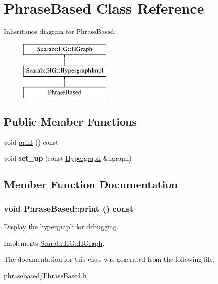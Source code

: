 \hypertarget{classPhraseBased}{
\section{PhraseBased Class Reference}
\label{classPhraseBased}
}
Inheritance diagram for PhraseBased:\begin{figure}[H]
\begin{center}
\leavevmode
\includegraphics[height=3cm]{classPhraseBased}
\end{center}
\end{figure}
\subsection*{Public Member Functions}
\begin{DoxyCompactItemize}
\item 
void \hyperlink{classPhraseBased_aafc2997b58b3698fed7cb5a1f6f269c6}{print} () const 
\item 
\hypertarget{classPhraseBased_a3883660c72be6ce8daab08f368317853}{
void {\bfseries set\_\-up} (const \hyperlink{classHypergraph}{Hypergraph} \&hgraph)}
\label{classPhraseBased_a3883660c72be6ce8daab08f368317853}

\end{DoxyCompactItemize}


\subsection{Member Function Documentation}
\hypertarget{classPhraseBased_aafc2997b58b3698fed7cb5a1f6f269c6}{
\subsubsection[{print}]{\setlength{\rightskip}{0pt plus 5cm}void PhraseBased::print () const}}
\label{classPhraseBased_aafc2997b58b3698fed7cb5a1f6f269c6}
Display the hypergraph for debugging. 

Implements \hyperlink{classScarab_1_1HG_1_1HGraph_ab5aa11c932b28864b56f28e0babbc1c1}{Scarab::HG::HGraph}.



The documentation for this class was generated from the following file:\begin{DoxyCompactItemize}
\item 
phrasebased/PhraseBased.h\end{DoxyCompactItemize}
